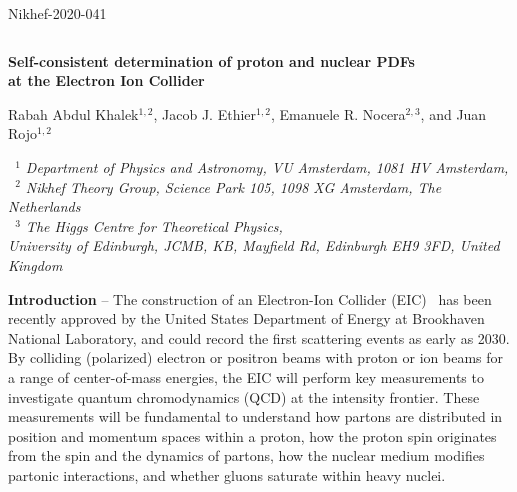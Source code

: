 \documentclass[11pt,a4paper]{article}
\newcommand{\myparagraph}[1]{\vspace{0.2cm} \noindent \textbf{#1} --}
\begin{document}
\begin{flushright}
Nikhef-2020-041
\end{flushright}

$\qquad$
\vspace{0.2cm}
\begin{center}
  {\Large \bf Self-consistent determination of proton and nuclear PDFs\\[0.3cm] at the Electron Ion Collider}
  \vspace{1.2cm}

Rabah Abdul Khalek$^{1,2}$,
Jacob J. Ethier$^{1,2}$,
Emanuele R. Nocera$^{2,3}$, 
and Juan Rojo$^{1,2}$
\vspace{1.0cm}
 
{\it \small 
~$^1$ Department of Physics and Astronomy, VU Amsterdam, 
 1081 HV Amsterdam,\\[0.1cm]
~$^2$ Nikhef Theory Group, Science Park 105, 
 1098 XG Amsterdam, The Netherlands\\[0.1cm]
 ~$^3$ The Higgs Centre for Theoretical Physics,\\
 University of Edinburgh, JCMB, KB, Mayfield Rd, Edinburgh EH9 3FD,
 United Kingdom
}
\end{center}

\vspace{0.7cm}

\begin{abstract}
  \noindent We quantify the impact of unpolarized lepton-proton and
  lepton-nucleus inclusive deep-inelastic scattering (DIS) cross section
  measurements from the future Electron-Ion Collider (EIC) on the proton
  and nuclear parton distribution functions (PDFs). To this purpose we include
  neutral- and charged-current DIS pseudodata in a self-consistent set of
  proton and nuclear global PDF determinations based on the NNPDF methodology.
  We demonstrate that the EIC measurements will reduce the uncertainty of the
  light quark PDFs of the proton at large values of the momentum fraction $x$,
  and, more significantly, of the quark and gluon PDFs of heavy nuclei,
  especially at small and large $x$. We illustrate
  the implications of the improved precision
  of nuclear PDFs for the interaction of ultra-high
  energy cosmic neutrinos with matter.
\end{abstract}

\myparagraph{Introduction} The construction of an Electron-Ion Collider
(EIC)~\cite{Accardi:2012qut,Aschenauer:2017jsk} has been recently approved by
the United States Department of Energy at Brookhaven National Laboratory, and
could record the first scattering events as early as 2030. By colliding
(polarized) electron or positron beams with proton or ion beams for a range of
center-of-mass energies, the EIC will perform key measurements to investigate
quantum chromodynamics (QCD) at the intensity frontier. These measurements will
be fundamental to understand how partons are distributed in position and
momentum spaces within a proton, how the proton spin originates from the spin
and the dynamics of partons, how the nuclear medium modifies partonic
interactions, and whether gluons saturate within heavy nuclei.
\end{document}
